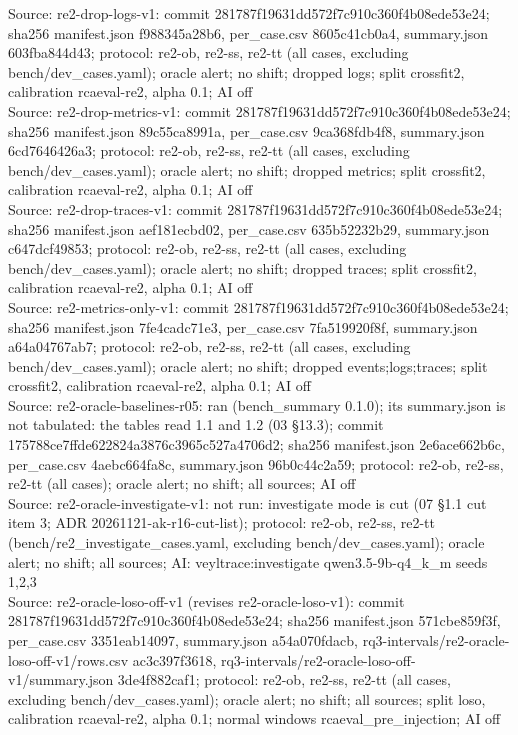 \begin{table}[t]
Source: re2-drop-logs-v1: commit 281787f19631dd572f7c910c360f4b08ede53e24; sha256 manifest.json f988345a28b6, per\_case.csv 8605c41cb0a4, summary.json 603fba844d43; protocol: re2-ob, re2-ss, re2-tt (all cases, excluding bench/dev\_cases.yaml); oracle alert; no shift; dropped logs; split crossfit2, calibration rcaeval-re2, alpha 0.1; AI off\\
Source: re2-drop-metrics-v1: commit 281787f19631dd572f7c910c360f4b08ede53e24; sha256 manifest.json 89c55ca8991a, per\_case.csv 9ca368fdb4f8, summary.json 6cd7646426a3; protocol: re2-ob, re2-ss, re2-tt (all cases, excluding bench/dev\_cases.yaml); oracle alert; no shift; dropped metrics; split crossfit2, calibration rcaeval-re2, alpha 0.1; AI off\\
Source: re2-drop-traces-v1: commit 281787f19631dd572f7c910c360f4b08ede53e24; sha256 manifest.json aef181ecbd02, per\_case.csv 635b52232b29, summary.json c647dcf49853; protocol: re2-ob, re2-ss, re2-tt (all cases, excluding bench/dev\_cases.yaml); oracle alert; no shift; dropped traces; split crossfit2, calibration rcaeval-re2, alpha 0.1; AI off\\
Source: re2-metrics-only-v1: commit 281787f19631dd572f7c910c360f4b08ede53e24; sha256 manifest.json 7fe4cadc71e3, per\_case.csv 7fa519920f8f, summary.json a64a04767ab7; protocol: re2-ob, re2-ss, re2-tt (all cases, excluding bench/dev\_cases.yaml); oracle alert; no shift; dropped events;logs;traces; split crossfit2, calibration rcaeval-re2, alpha 0.1; AI off\\
Source: re2-oracle-baselines-r05: ran (bench\_summary 0.1.0); its summary.json is not tabulated: the tables read 1.1 and 1.2 (03 \S{}13.3); commit 175788ce7ffde622824a3876c3965c527a4706d2; sha256 manifest.json 2e6ace662b6c, per\_case.csv 4aebc664fa8c, summary.json 96b0c44c2a59; protocol: re2-ob, re2-ss, re2-tt (all cases); oracle alert; no shift; all sources; AI off\\
Source: re2-oracle-investigate-v1: not run: investigate mode is cut (07 \S{}1.1 cut item 3; ADR 20261121-ak-r16-cut-list); protocol: re2-ob, re2-ss, re2-tt (bench/re2\_investigate\_cases.yaml, excluding bench/dev\_cases.yaml); oracle alert; no shift; all sources; AI: veyltrace:investigate qwen3.5-9b-q4\_k\_m seeds 1,2,3\\
Source: re2-oracle-loso-off-v1 (revises re2-oracle-loso-v1): commit 281787f19631dd572f7c910c360f4b08ede53e24; sha256 manifest.json 571cbe859f3f, per\_case.csv 3351eab14097, summary.json a54a070fdacb, rq3-intervals/re2-oracle-loso-off-v1/rows.csv ac3c397f3618, rq3-intervals/re2-oracle-loso-off-v1/summary.json 3de4f882caf1; protocol: re2-ob, re2-ss, re2-tt (all cases, excluding bench/dev\_cases.yaml); oracle alert; no shift; all sources; split loso, calibration rcaeval-re2, alpha 0.1; normal windows rcaeval\_pre\_injection; AI off\\

\end{table}
